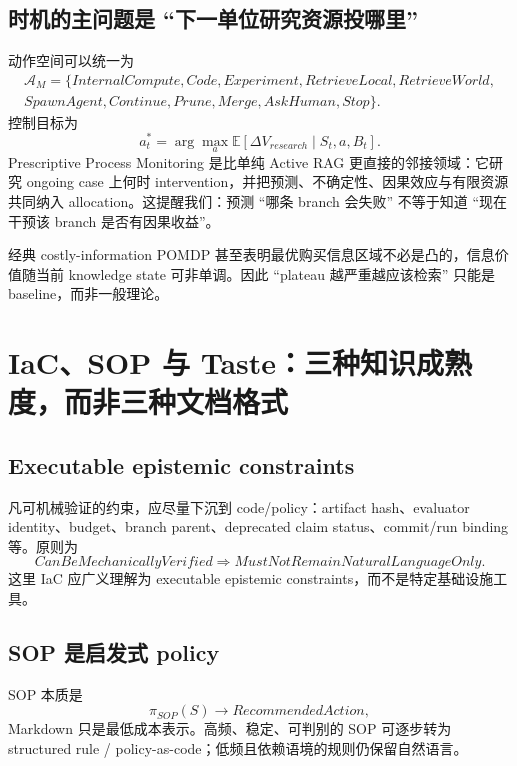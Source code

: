 \documentclass[11pt,a4paper]{ctexart}
\newcommand{\E}{\mathbb{E}}
\newcommand{\A}{\mathcal{A}}
\begin{document}
\subsection{时机的主问题是 ``下一单位研究资源投哪里''}
动作空间可以统一为
\begin{equation}
\begin{gathered}
\A_M=\{InternalCompute,Code,Experiment,RetrieveLocal,RetrieveWorld,\\
SpawnAgent,Continue,Prune,Merge,AskHuman,Stop\}.
\end{gathered}
\end{equation}
控制目标为
\begin{equation}
a_t^*=\arg\max_a \E[\Delta V_{research}\mid S_t,a,B_t].
\end{equation}
Prescriptive Process Monitoring 是比单纯 Active RAG 更直接的邻接领域：它研究 ongoing case 上何时 intervention，并把预测、不确定性、因果效应与有限资源共同纳入 allocation\cite{shoush2022resource,shoush2022when,delias2026policy}。这提醒我们：预测 ``哪条 branch 会失败'' 不等于知道 ``现在干预该 branch 是否有因果收益''。

经典 costly-information POMDP 甚至表明最优购买信息区域不必是凸的，信息价值随当前 knowledge state 可非单调\cite{monahan1980costly}。因此 ``plateau 越严重越应该检索'' 只能是 baseline，而非一般理论。

\section{IaC、SOP 与 Taste：三种知识成熟度，而非三种文档格式}

\subsection{Executable epistemic constraints}
凡可机械验证的约束，应尽量下沉到 code/policy：artifact hash、evaluator identity、budget、branch parent、deprecated claim status、commit/run binding 等。原则为
\begin{equation}
CanBeMechanicallyVerified\Rightarrow MustNotRemainNaturalLanguageOnly.
\end{equation}
这里 IaC 应广义理解为 executable epistemic constraints，而不是特定基础设施工具。

\subsection{SOP 是启发式 policy}
SOP 本质是
\begin{equation}
\pi_{SOP}(S)\to RecommendedAction,
\end{equation}
Markdown 只是最低成本表示。高频、稳定、可判别的 SOP 可逐步转为 structured rule / policy-as-code；低频且依赖语境的规则仍保留自然语言。
\end{document}
